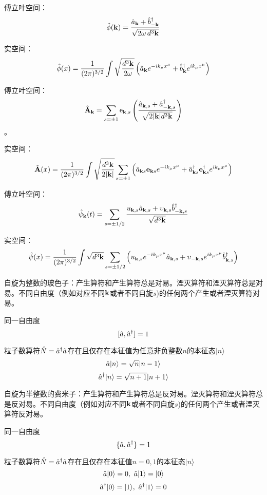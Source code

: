 \documentclass[CJK]{beamer}
\begin{document}
\begin{frame}
\bch
傅立叶空间：
$${\hat{\phi}}({\mathbf{k}}) = \frac{{\hat{a}}_{{\mathbf{k}}}+{\hat{b}^\dagger}_{-{\mathbf{k}}}}{\sqrt{2\omega\, d^3{\mathbf{k}}}}$$


\skipline
实空间：
$${\hat{\phi}}(x) = \frac{1}{(2\pi)^{3/2}} \int \sqrt{\frac{d^3{\mathbf{k}}}{2\omega}} \left({\hat{a}}_{{\mathbf{k}}} e^{-ik_\mu x^\mu} + {\hat{b}^\dagger}_{{\mathbf{k}}}e^{ik_\mu x^\mu}\right) $$
\ech
\end{frame}

\begin{frame}
\bch

傅立叶空间：
$$ \hat{{\mathbf{A}}}_{{\mathbf{k}}} = \sum_{s=\pm 1} \mathrm{e}_{{\mathbf{k}},s}\left(\frac{{\hat{a}}_{{\mathbf{k}},s} + {\hat{a}^\dagger}_{-{\mathbf{k}},s}}{\sqrt{2 |{\mathbf{k}}| d^3{\mathbf{k}}}}\right)$$。


\skipline
实空间：
$$\hat{{\mathbf{A}}}(x) = \frac{1}{(2\pi)^{3/2}} \int \sqrt{\frac{d^3{\mathbf{k}}}{2|{\mathbf{k}}|}} \sum_{s=\pm 1}\left({\hat{a}}_{{\mathbf{k}} s} \mathbf{e}_{{\mathbf{k}} s} e^{-ik_\mu x^\mu} + {\hat{a}^\dagger}_{{\mathbf{k}} s} \mathbf{e}^\dagger_{{\mathbf{k}} s} e^{ik_\mu x^\mu}\right) $$
\ech
\end{frame}

\begin{frame}
\bch
傅立叶空间：
$$\hat\psi_{{\mathbf{k}}}(t) = \sum_{s=\pm 1/2} \frac{u_{{\mathbf{k}},s}{\hat{a}}_{{\mathbf{k}},s} + \upsilon_{{\mathbf{k}},s}{\hat{b}^\dagger}_{-{\mathbf{k}},s}}{\sqrt{d^3{\mathbf{k}}}} $$

实空间：
$$\hat\psi(x) = \frac{1}{(2\pi)^{3/2}}\int \sqrt{d^3{\mathbf{k}}} \sum_{s=\pm 1/2} \left(u_{{\mathbf{k}},s}e^{-{\dot{\imath}} k_\mu x^\mu} {\hat{a}}_{{\mathbf{k}},s} + \upsilon_{-{\mathbf{k}},s}e^{{\dot{\imath}} k_\mu x^\mu} {\hat{b}^\dagger}_{{\mathbf{k}},s}\right)$$
\ech
\end{frame}

\begin{frame}
\bch
自旋为整数的玻色子：产生算符和产生算符总是对易。湮灭算符和湮灭算符总是对易。不同自由度（例如对应不同${\mathbf{k}}$或者不同自旋$s$)的任何两个产生或者湮灭算符对易。

同一自由度
$$[{\hat{a}}, {\hat{a}^\dagger}] = 1$$

\skipline
粒子数算符$\hat{N}={\hat{a}^\dagger}{\hat{a}}$存在且仅存在本征值为任意非负整数$n$的本征态$|n\rangle$
$${\hat{a}}|n\rangle = \sqrt{n}|n-1\rangle $$
$${\hat{a}^\dagger}|n\rangle = \sqrt{n+1}|n+1\rangle$$

\ech
\end{frame}

\begin{frame}
\bch
自旋为半整数的费米子：产生算符和产生算符总是反对易。湮灭算符和湮灭算符总是反对易。不同自由度（例如对应不同${\mathbf{k}}$或者不同自旋$s$)的任何两个产生或者湮灭算符反对易。

同一自由度
$$\{{\hat{a}}, {\hat{a}^\dagger}\} = 1$$

\skipline
粒子数算符$\hat{N}={\hat{a}^\dagger}{\hat{a}}$存在且仅存在本征值$n=0,1$的本征态$|n\rangle$
$${\hat{a}}|0 \rangle = 0,\ {\hat{a}}|1\rangle = |0\rangle $$
$${\hat{a}^\dagger}|0 \rangle = |1\rangle, \  {\hat{a}^\dagger}|1\rangle = 0$$
 
\ech
\end{frame}
\end{document}
